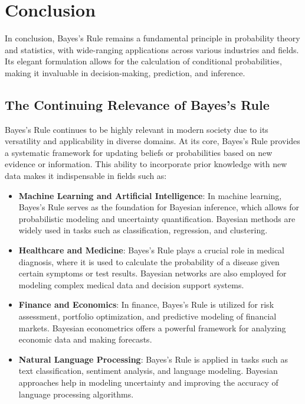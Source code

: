 \documentclass[12pt]{book} %
\begin{document}
\section{Conclusion}
In conclusion, Bayes's Rule remains a fundamental principle in probability theory and statistics, with wide-ranging applications across various industries and fields. Its elegant formulation allows for the calculation of conditional probabilities, making it invaluable in decision-making, prediction, and inference.

\subsection{The Continuing Relevance of Bayes's Rule}
Bayes's Rule continues to be highly relevant in modern society due to its versatility and applicability in diverse domains. At its core, Bayes's Rule provides a systematic framework for updating beliefs or probabilities based on new evidence or information. This ability to incorporate prior knowledge with new data makes it indispensable in fields such as:

\begin{itemize}
    \item \textbf{Machine Learning and Artificial Intelligence}: In machine learning, Bayes's Rule serves as the foundation for Bayesian inference, which allows for probabilistic modeling and uncertainty quantification. Bayesian methods are widely used in tasks such as classification, regression, and clustering.
    
    \item \textbf{Healthcare and Medicine}: Bayes's Rule plays a crucial role in medical diagnosis, where it is used to calculate the probability of a disease given certain symptoms or test results. Bayesian networks are also employed for modeling complex medical data and decision support systems.
    
    \item \textbf{Finance and Economics}: In finance, Bayes's Rule is utilized for risk assessment, portfolio optimization, and predictive modeling of financial markets. Bayesian econometrics offers a powerful framework for analyzing economic data and making forecasts.
    
    \item \textbf{Natural Language Processing}: Bayes's Rule is applied in tasks such as text classification, sentiment analysis, and language modeling. Bayesian approaches help in modeling uncertainty and improving the accuracy of language processing algorithms.
\end{itemize}
\end{document}
